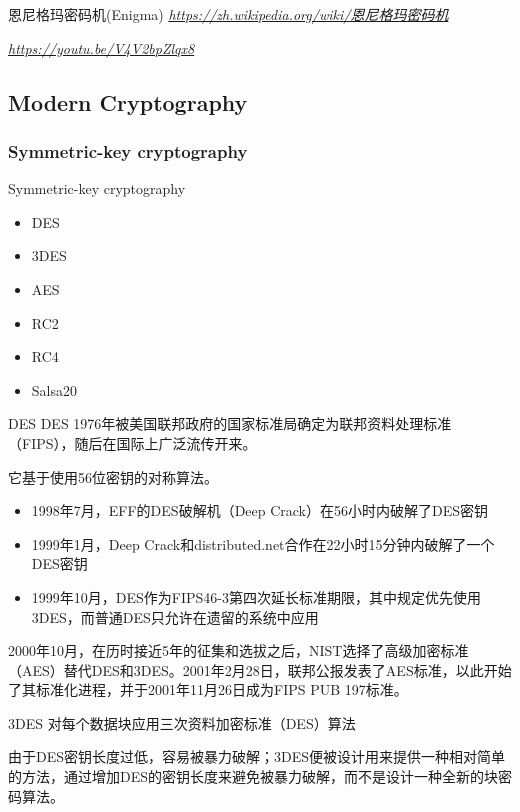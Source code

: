 \documentclass[UTF8]{ctexbeamer}
\begin{document}
\begin{frame}{恩尼格玛密码机(Enigma)}
    \textit{\url{https://zh.wikipedia.org/wiki/恩尼格玛密码机}}
    
    \textit{\url{https://youtu.be/V4V2bpZlqx8}}
\end{frame}
\subsection{Modern Cryptography}
\subsubsection{Symmetric-key cryptography}

\begin{frame}{Symmetric-key cryptography}
    \begin{itemize}
        \item DES
        \item 3DES
        \item AES
        \item RC2
        \item RC4
        \item Salsa20
    \end{itemize}
\end{frame}

\begin{frame}{DES}
    DES 1976年被美国联邦政府的国家标准局确定为联邦资料处理标准（FIPS），随后在国际上广泛流传开来。
    
    它基于使用56位密钥的对称算法。
    
    \pause
    
    \begin{itemize}
        \item 1998年7月，EFF的DES破解机（Deep Crack）在56小时内破解了DES密钥
        \item 1999年1月，Deep Crack和distributed.net合作在22小时15分钟内破解了一个DES密钥
        \item 1999年10月，DES作为FIPS46-3第四次延长标准期限，其中规定优先使用3DES，而普通DES只允许在遗留的系统中应用
    \end{itemize}
    
    \pause
    
    2000年10月，在历时接近5年的征集和选拔之后，NIST选择了高级加密标准（AES）替代DES和3DES。2001年2月28日，联邦公报发表了AES标准，以此开始了其标准化进程，并于2001年11月26日成为FIPS PUB 197标准。
\end{frame}
\begin{frame}{3DES}
    对每个数据块应用三次资料加密标准（DES）算法
    
    由于DES密钥长度过低，容易被暴力破解；3DES便被设计用来提供一种相对简单的方法，通过增加DES的密钥长度来避免被暴力破解，而不是设计一种全新的块密码算法。
\end{frame}
\end{document}
